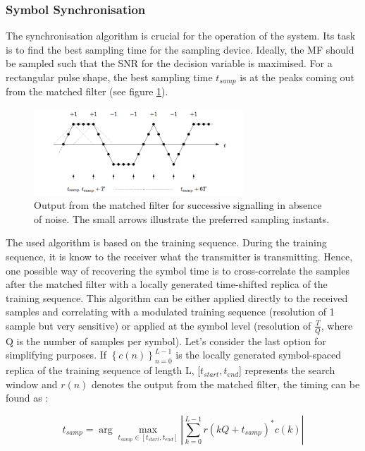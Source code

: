 \documentclass[12pt,a4paper,openright]{article}
\begin{document}
\subsubsection{Symbol Synchronisation}
The synchronisation algorithm is crucial for the operation of the system. Its task is to find the best sampling time for the sampling device. Ideally, the MF should be sampled such that the SNR for the decision variable is maximised. For a rectangular pulse shape, the best sampling time $t_{samp}$ is at the peaks coming out from the matched filter (see figure \ref{fig:mfpeaks}).

 \begin{figure}[h]
  \centering
    \includegraphics[width=0.7\textwidth]{mfpeaks.pdf}
    \caption{Output from the matched filter for successive signalling in absence of noise. The small arrows illustrate the preferred sampling instants\protect\cite{ProjectEQ2310}.}
    \label{fig:mfpeaks}
\end{figure}


The used algorithm is based on the training sequence. During the training sequence, it is know to the receiver what the transmitter is transmitting. Hence, one possible way of recovering the symbol time is to cross-correlate the samples after the matched filter with a locally generated time-shifted replica of the training sequence. This algorithm can be either applied directly to the received samples and correlating with a modulated training sequence (resolution of 1 sample but very sensitive) or applied at the symbol level (resolution of $\frac{T}{Q}$, where Q is the number of samples per symbol). Let's consider the last option for simplifying purposes. If ${\left\{ {c(n)} \right\}_{n = 0}^{L - 1}}$ is the locally generated symbol-spaced replica of the training sequence of length L, [$t_{start},t_{end}$] represents the search window and $r(n)$ denotes the output from the matched filter, the timing can be found as \cite{HaykinBook}:

\[{t_{samp}} = \arg \mathop {\max }\limits_{{t_{samp}} \in [{t_{start}},{t_{end}}]} \left| {\sum\limits_{k = 0}^{L - 1} {r(kQ + {t_{samp}})^*c(k)} } \right|\]
\end{document}
